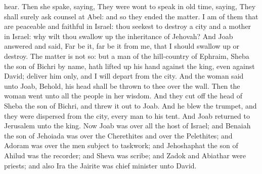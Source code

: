 hear. Then she spake, saying, They were wont to speak in old time, saying, They shall surely ask counsel at Abel: and so they ended the matter. I am of them that are peaceable and faithful in Israel: thou seekest to destroy a city and a mother in Israel: why wilt thou swallow up the inheritance of Jehovah? And Joab answered and said, Far be it, far be it from me, that I should swallow up or destroy. The matter is not so: but a man of the hill-country of Ephraim, Sheba the son of Bichri by name, hath lifted up his hand against the king, even against David; deliver him only, and I will depart from the city. And the woman said unto Joab, Behold, his head shall be thrown to thee over the wall. Then the woman went unto all the people in her wisdom. And they cut off the head of Sheba the son of Bichri, and threw it out to Joab. And he blew the trumpet, and they were dispersed from the city, every man to his tent. And Joab returned to Jerusalem unto the king.  Now Joab was over all the host of Israel; and Benaiah the son of Jehoiada was over the Cherethites and over the Pelethites; and Adoram was over the men subject to taskwork; and Jehoshaphat the son of Ahilud was the recorder; and Sheva was scribe; and Zadok and Abiathar were priests; and also Ira the Jairite was chief minister unto David. 

